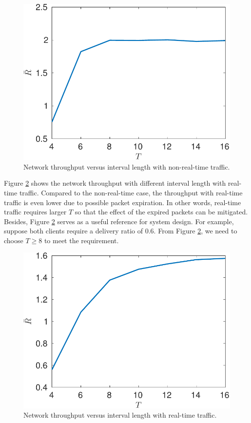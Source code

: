\documentclass{article}
\begin{document}
\begin{figure}[htbp]
\centering
\includegraphics[width=.6\textwidth]{nonrealtime_throughput_T.pdf}
\caption{Network throughput versus interval length with non-real-time traffic.}
\label{nonrealtime_throughput_T}
\end{figure}

Figure \ref{realtime_throughput_T} shows the network throughput with different interval length with real-time traffic. Compared to the non-real-time case, the throughput with real-time traffic is even lower due to possible packet expiration. In other words, real-time traffic requires larger $T$ so that the effect of the expired packets can be mitigated. Besides, Figure \ref{realtime_throughput_T} serves as a useful reference for system design. For example, suppose both clients require a delivery ratio of 0.6. From Figure \ref{realtime_throughput_T}, we need to choose $T\geq 8$ to meet the requirement. 

\begin{figure}[htbp]
\centering
\includegraphics[width=.6\textwidth]{realtime_throughput_T.pdf}
\caption{Network throughput versus interval length with real-time traffic.}
\label{realtime_throughput_T}
\end{figure}
\end{document}
